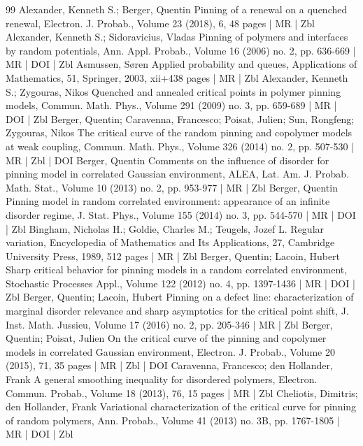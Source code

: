 \begin{thebibliography}{99}
Alexander, Kenneth S.; Berger, Quentin Pinning of a renewal on a quenched renewal, Electron. J. Probab., Volume 23 (2018), 6, 48 pages | MR | Zbl
Alexander, Kenneth S.; Sidoravicius, Vladas Pinning of polymers and interfaces by random potentials, Ann. Appl. Probab., Volume 16 (2006) no. 2, pp. 636-669 | MR | DOI | Zbl
Asmussen, Søren Applied probability and queues, Applications of Mathematics, 51, Springer, 2003, xii+438 pages | MR | Zbl
Alexander, Kenneth S.; Zygouras, Nikos Quenched and annealed critical points in polymer pinning models, Commun. Math. Phys., Volume 291 (2009) no. 3, pp. 659-689 | MR | DOI | Zbl
Berger, Quentin; Caravenna, Francesco; Poisat, Julien; Sun, Rongfeng; Zygouras, Nikos The critical curve of the random pinning and copolymer models at weak coupling, Commun. Math. Phys., Volume 326 (2014) no. 2, pp. 507-530 | MR | Zbl | DOI
Berger, Quentin Comments on the influence of disorder for pinning model in correlated Gaussian environment, ALEA, Lat. Am. J. Probab. Math. Stat., Volume 10 (2013) no. 2, pp. 953-977 | MR | Zbl
Berger, Quentin Pinning model in random correlated environment: appearance of an infinite disorder regime, J. Stat. Phys., Volume 155 (2014) no. 3, pp. 544-570 | MR | DOI | Zbl
Bingham, Nicholas H.; Goldie, Charles M.; Teugels, Jozef L. Regular variation, Encyclopedia of Mathematics and Its Applications, 27, Cambridge University Press, 1989, 512 pages | MR | Zbl
Berger, Quentin; Lacoin, Hubert Sharp critical behavior for pinning models in a random correlated environment, Stochastic Processes Appl., Volume 122 (2012) no. 4, pp. 1397-1436 | MR | DOI | Zbl
Berger, Quentin; Lacoin, Hubert Pinning on a defect line: characterization of marginal disorder relevance and sharp asymptotics for the critical point shift, J. Inst. Math. Jussieu, Volume 17 (2016) no. 2, pp. 205-346 | MR | Zbl
Berger, Quentin; Poisat, Julien On the critical curve of the pinning and copolymer models in correlated Gaussian environment, Electron. J. Probab., Volume 20 (2015), 71, 35 pages | MR | Zbl | DOI
Caravenna, Francesco; den Hollander, Frank A general smoothing inequality for disordered polymers, Electron. Commun. Probab., Volume 18 (2013), 76, 15 pages | MR | Zbl
Cheliotis, Dimitris; den Hollander, Frank Variational characterization of the critical curve for pinning of random polymers, Ann. Probab., Volume 41 (2013) no. 3B, pp. 1767-1805 | MR | DOI | Zbl

\end{thebibliography}
